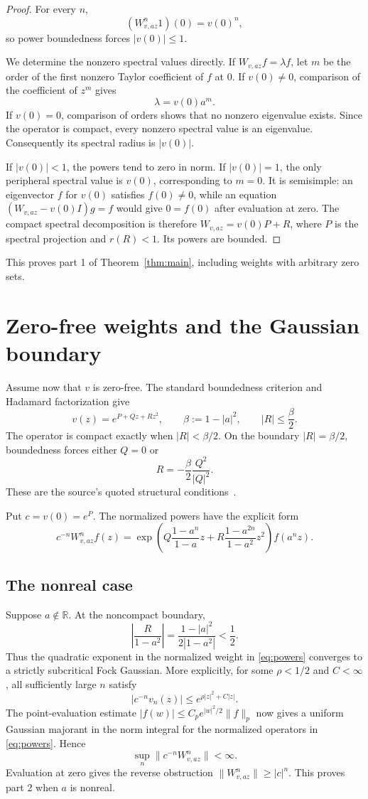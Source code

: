 \documentclass[11pt]{article}
\begin{document}
\begin{proof}
For every $n$,
\[
 (W_{v,az}^n1)(0)=v(0)^n,
\]
so power boundedness forces $|v(0)|\le1$.

We determine the nonzero spectral values directly.  If
$W_{v,az}f=\lambda f$, let $m$ be the order of the first nonzero Taylor
coefficient of $f$ at $0$.  If $v(0)\ne0$, comparison of the coefficient of
$z^m$ gives
\[
 \lambda=v(0)a^m.
 \tag{2}\label{eq:eigen}
\]
If $v(0)=0$, comparison of orders shows that no nonzero eigenvalue exists.
Since the operator is compact, every nonzero spectral value is an eigenvalue.
Consequently its spectral radius is $|v(0)|$.

If $|v(0)|<1$, the powers tend to zero in norm.  If $|v(0)|=1$, the only
peripheral spectral value is $v(0)$, corresponding to $m=0$.  It is
semisimple: an eigenvector $f$ for $v(0)$ satisfies $f(0)\ne0$, while an
equation $(W_{v,az}-v(0)I)g=f$ would give $0=f(0)$ after evaluation at zero.
The compact spectral decomposition is therefore
$W_{v,az}=v(0)P+R$, where $P$ is the spectral projection and $r(R)<1$.
Its powers are bounded.
\end{proof}

This proves part 1 of Theorem~\ref{thm:main}, including weights with arbitrary
zero sets.

\section{Zero-free weights and the Gaussian boundary}

Assume now that $v$ is zero-free.  The standard boundedness criterion and
Hadamard factorization give
\[
 v(z)=e^{P+Qz+Rz^2},\qquad \beta:=1-|a|^2,\qquad |R|\le\frac\beta2.
 \tag{3}\label{eq:quadratic}
\]
The operator is compact exactly when $|R|<\beta/2$.  On the boundary
$|R|=\beta/2$, boundedness forces either $Q=0$ or
\[
 R=-\frac\beta2\frac{Q^2}{|Q|^2}.
 \tag{4}\label{eq:boundary}
\]
These are the source's quoted structural conditions~\cite{iteration}.

Put $c=v(0)=e^P$.  The normalized powers have the explicit form
\[
 c^{-n}W_{v,az}^nf(z)
 =\exp\!\left(
 Q\frac{1-a^n}{1-a}z+R\frac{1-a^{2n}}{1-a^2}z^2
 \right)f(a^nz).
 \tag{5}\label{eq:powers}
\]

\subsection*{The nonreal case}

Suppose $a\notin\mathbb R$.  At the noncompact boundary,
\[
 \left|\frac{R}{1-a^2}\right|
 =\frac{1-|a|^2}{2|1-a^2|}<\frac12.
 \tag{6}\label{eq:strict}
\]
Thus the quadratic exponent in the normalized weight in
\eqref{eq:powers} converges to a strictly subcritical Fock Gaussian.  More
explicitly, for some $\rho<1/2$ and $C<\infty$, all sufficiently large $n$
satisfy
\[
 \left|c^{-n}v_n(z)\right|\le e^{\rho|z|^2+C|z|}.
\]
The point-evaluation estimate
$|f(w)|\le C_p e^{|w|^2/2}\|f\|_p$ now gives a uniform Gaussian majorant in
the norm integral for the normalized operators in \eqref{eq:powers}.
Hence
\[
 \sup_n\|c^{-n}W_{v,az}^n\|<\infty.
\]
Evaluation at zero gives the reverse obstruction $\|W_{v,az}^n\|\ge|c|^n$.
This proves part 2 when $a$ is nonreal.
\end{document}

